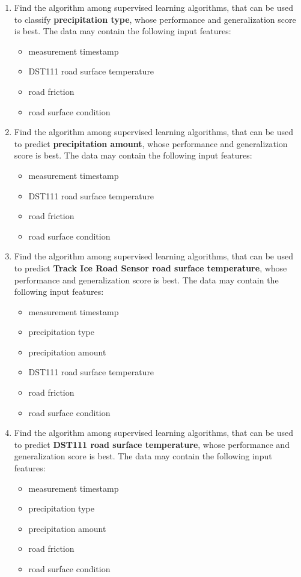 	\begin{enumerate}
		\item Find the algorithm among supervised learning algorithms, that can be used to classify \textbf{precipitation type}, whose performance and generalization score is best. The data may contain the following input features: 
			\begin{itemize}
				\item measurement timestamp
				\item DST111 road surface temperature
				\item road friction
				\item road surface condition
			\end{itemize}
		\item Find the algorithm among supervised learning algorithms, that can be used to predict \textbf{precipitation amount}, whose performance and generalization score is best. The data may contain the following input features: 
			\begin{itemize}
				\item measurement timestamp
				\item DST111 road surface temperature
				\item road friction
				\item road surface condition
			\end{itemize}
		\item Find the algorithm among supervised learning algorithms, that can be used to predict \textbf{Track Ice Road Sensor road surface temperature}, whose performance and generalization score is best. The data may contain the following input features: 
			\begin{itemize}
				\item measurement timestamp
				\item precipitation type
				\item precipitation amount
				\item DST111 road surface temperature
				\item road friction
				\item road surface condition
			\end{itemize}
		\item Find the algorithm among supervised learning algorithms, that can be used to predict \textbf{DST111 road surface temperature}, whose performance and generalization score is best. The data may contain the following input features: 
			\begin{itemize}
				\item measurement timestamp
				\item precipitation type
				\item precipitation amount
				\item road friction
				\item road surface condition
			\end{itemize}
	\end{enumerate}

